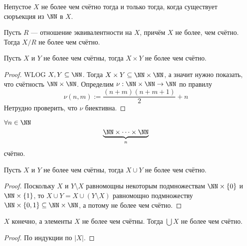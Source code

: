 \documentclass[12pt,a4paper]{article}
\begin{document}
    \begin{corollary}
        Непустое $X$ не более чем счётно тогда и только тогда, когда существует сюръекция из $\NN$ в $X$.
    \end{corollary}

    \begin{corollary}
        Пусть $R$ --- отношение эквивалентности на $X$, причём $X$ не более, чем счётно. Тогда $X/R$ не более чем счётно.
    \end{corollary}

    \begin{statement}
        Пусть $X$ и $Y$ не более чем счётны, тогда $X \times Y$ не более чем счётно.
    \end{statement}

    \begin{proof}
        WLOG $X, Y \subseteq \NN$. Тогда $X \times Y \subseteq \NN \times \NN$, а значит нужно показать, что счётность $\NN \times \NN$. Определим $\nu: \NN \times \NN \to \NN$ по правилу
        \[\nu(n, m) := \frac{(n+m)(n+m+1)}{2} + n\]
        Нетрудно проверить, что $\nu$ биективна.
    \end{proof}

    \begin{corollary} $\forall n \in \NN$
        \[\underbrace{\NN \times \dots \times \NN}_n\]
        счётно.
    \end{corollary}

    \begin{corollary}
        Пусть $X$ и $Y$ не более чем счётны, тогда $X \cup Y$ не более чем счётно.
    \end{corollary}

    \begin{proof}
        Поскольку $X$ и $Y\setminus X$ равномощны некоторым подмножествам $\NN \times \{0\}$ и $\NN \times \{1\}$, то $X \cup Y = X \cup (Y \setminus X)$ равномощно подмножеству $\NN \times \{0, 1\} \subseteq \NN \times \NN$, а потому не более чем счётно.
    \end{proof}

    \begin{statement}
        $X$ конечно, а элементы $X$ не более чем счётны. Тогда $\bigcup X$ не более чем счётно.
    \end{statement}

    \begin{proof}
        По индукции по $|X|$.
    \end{proof}
\end{document}
